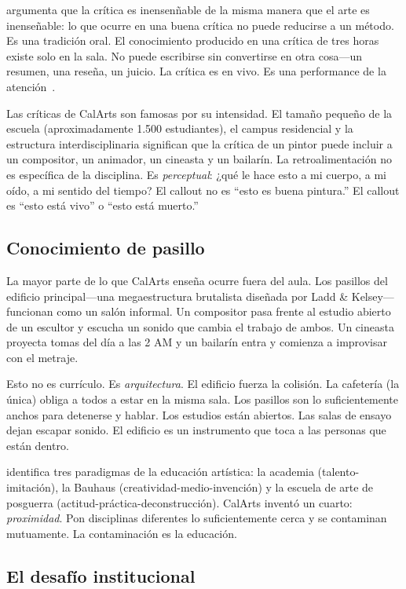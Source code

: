 \documentclass[10pt,letterpaper,twocolumn]{article}
\begin{document}
\citet{elkins2001why} argumenta que la crítica es inensenñable de la misma manera que el arte es inenseñable: lo que ocurre en una buena crítica no puede reducirse a un método. Es una tradición oral. El conocimiento producido en una crítica de tres horas existe solo en la sala. No puede escribirse sin convertirse en otra cosa---un resumen, una reseña, un juicio. La crítica es en vivo. Es una performance de la atención~\citep{hooks1994teaching}.

Las críticas de CalArts son famosas por su intensidad. El tamaño pequeño de la escuela (aproximadamente 1.500 estudiantes), el campus residencial y la estructura interdisciplinaria significan que la crítica de un pintor puede incluir a un compositor, un animador, un cineasta y un bailarín. La retroalimentación no es específica de la disciplina. Es \emph{perceptual}: ¿qué le hace esto a mi cuerpo, a mi oído, a mi sentido del tiempo? El callout no es ``esto es buena pintura.'' El callout es ``esto está vivo'' o ``esto está muerto.''

\subsection{Conocimiento de pasillo}

La mayor parte de lo que CalArts enseña ocurre fuera del aula. Los pasillos del edificio principal---una megaestructura brutalista diseñada por Ladd \& Kelsey---funcionan como un salón informal. Un compositor pasa frente al estudio abierto de un escultor y escucha un sonido que cambia el trabajo de ambos. Un cineasta proyecta tomas del día a las 2 AM y un bailarín entra y comienza a improvisar con el metraje.

Esto no es currículo. Es \emph{arquitectura}. El edificio fuerza la colisión. La cafetería (la única) obliga a todos a estar en la misma sala. Los pasillos son lo suficientemente anchos para detenerse y hablar. Los estudios están abiertos. Las salas de ensayo dejan escapar sonido. El edificio es un instrumento que toca a las personas que están dentro.

\citet{deduve1994attitude} identifica tres paradigmas de la educación artística: la academia (talento-imitación), la Bauhaus (creatividad-medio-invención) y la escuela de arte de posguerra (actitud-práctica-deconstrucción). CalArts inventó un cuarto: \emph{proximidad}. Pon disciplinas diferentes lo suficientemente cerca y se contaminan mutuamente. La contaminación es la educación.

\subsection{El desafío institucional}
\end{document}
